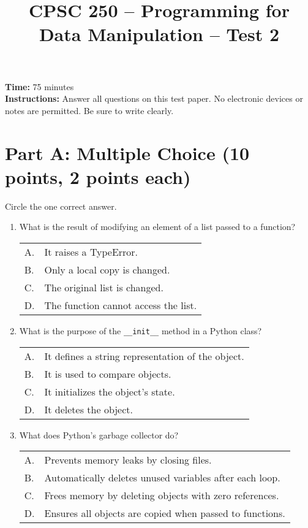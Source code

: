 \documentclass[11pt]{article}
\title{\vspace{-1cm}CPSC 250 – Programming for Data Manipulation – Test 2}
\date{}
\begin{document}
\maketitle

\noindent\textbf{Time:} 75 minutes \\
\textbf{Instructions:} Answer all questions on this test paper. No electronic devices or notes are permitted. Be sure to write clearly.

\vspace{0.5cm}
\section*{Part A: Multiple Choice (10 points, 2 points each)}
\noindent Circle the one correct answer.

\begin{enumerate}[label=\arabic*.]
    \item What is the result of modifying an element of a list passed to a function? \\
    \begin{tabular}{ll}
        A. & It raises a TypeError. \\
        B. & Only a local copy is changed. \\
        C. & The original list is changed. \\
        D. & The function cannot access the list.
    \end{tabular}

    \item What is the purpose of the \verb|__init__| method in a Python class? \\
    \begin{tabular}{ll}
        A. & It defines a string representation of the object. \\
        B. & It is used to compare objects. \\
        C. & It initializes the object’s state. \\
        D. & It deletes the object.
    \end{tabular}

    \item What does Python’s garbage collector do? \\
    \begin{tabular}{ll}
        A. & Prevents memory leaks by closing files. \\
        B. & Automatically deletes unused variables after each loop. \\
        C. & Frees memory by deleting objects with zero references. \\
        D. & Ensures all objects are copied when passed to functions.
    \end{tabular}


\end{enumerate}
\end{document}

